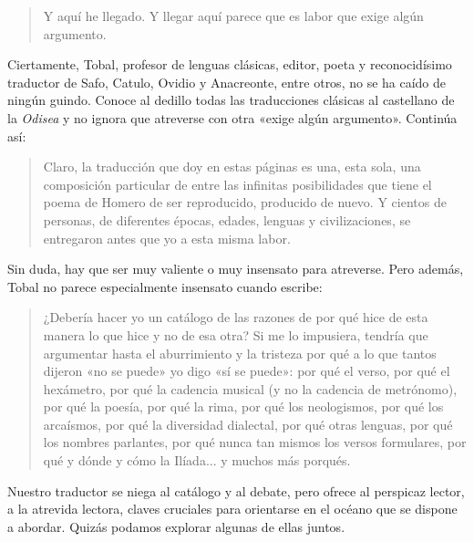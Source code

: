 \begin{quotation}
Y aquí he llegado. Y llegar aquí parece que es labor que exige algún argumento.
\end{quotation}

Ciertamente, Tobal, profesor de lenguas clásicas, editor, poeta y reconocidísimo traductor de Safo, Catulo, Ovidio y Anacreonte, entre otros, no se ha caído de ningún guindo. Conoce al dedillo todas las traducciones clásicas al castellano de la \emph{Odisea} y no ignora que atreverse con otra «exige algún argumento». Continúa así:

\begin{quotation}
Claro, la traducción que doy en estas páginas es una, esta sola, una composición particular de entre las infinitas posibilidades que tiene el poema de Homero de ser reproducido, producido de nuevo. Y cientos de personas, de diferentes épocas, edades, lenguas y civilizaciones, se entregaron antes que yo a esta misma labor.
\end{quotation}


Sin duda, hay que ser muy valiente o muy insensato para atreverse.
%
Pero además, Tobal no parece especialmente insensato cuando escribe:

\begin{quotation}
¿Debería hacer yo un catálogo de las razones de por qué hice de esta manera lo que hice y no de esa otra? Si me lo impusiera, tendría que argumentar hasta el aburrimiento y la tristeza por qué a lo que tantos dijeron «no se puede» yo digo «sí se puede»: por qué el verso, por qué el hexámetro, por qué la cadencia musical (y no la cadencia de metrónomo), por qué la poesía, por qué la rima, por qué los neologismos, por qué los arcaísmos, por qué la diversidad dialectal, por qué otras lenguas, por qué los nombres parlantes, por qué nunca tan mismos los versos formulares, por qué y dónde y cómo la Ilíada... y muchos más porqués.
\end{quotation}

Nuestro traductor se niega al catálogo y al debate, pero ofrece al perspicaz lector, a la atrevida lectora, claves cruciales para orientarse en el océano que se dispone a abordar. Quizás podamos explorar algunas de ellas juntos.

